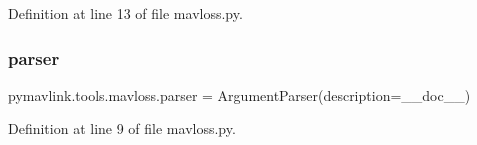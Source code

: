 Definition at line 13 of file mavloss.\+py.

\mbox{\label{namespacepymavlink_1_1tools_1_1mavloss_a18a84b3878825da57160d0632e8ff588}} 
\subsubsection{\texorpdfstring{parser}{parser}}
{\footnotesize\ttfamily pymavlink.\+tools.\+mavloss.\+parser = Argument\+Parser(description=\+\_\+\+\_\+doc\+\_\+\+\_\+)}



Definition at line 9 of file mavloss.\+py.

